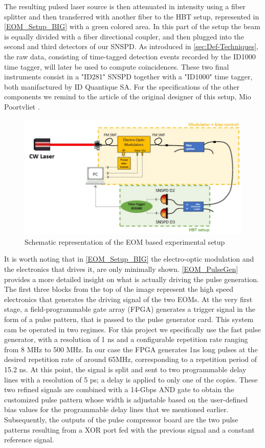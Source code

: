The resulting pulsed laser source is then attenuated in intensity using a fiber splitter and then transferred with another fiber to the HBT setup, represented in \autoref{EOM_Setup_BIG} with a green colored area.
In this part of the setup the beam is equally divided with a fiber directional coupler, and then plugged into the second and third detectors of our SNSPD. As introduced in \autoref{sec:Def-Techniques}, the raw data, consisting of time-tagged detection events recorded by the ID1000 time tagger, will later be used to compute coincidences. These two final instruments consist in a "ID281" SNSPD together with a "ID1000" time tagger, both manifactured by ID Quantique SA.
For the specifications of the other components we remind to the article of the original designer of this setup, Mio Poortvliet \cite{MioArticle}.

\begin{figure}[hbtp]
\centering
\includegraphics[width=1\textwidth]{EOMsetupBIG.jpg}
\caption{Schematic representation of the EOM based experimental setup}
\label{EOM_Setup_BIG}
\end{figure}
It is worth noting that in \autoref{EOM_Setup_BIG} the electro-optic modulation and the electronics that drives it, are only minimally shown. \autoref{EOM_PulseGen} provides a more detailed insight on what is actually driving the pulse generation.
The first three blocks from the top of the image represent the high speed electronics that generates the driving signal of the two EOMs.
At the very first stage, a field-programmable gate array (FPGA) generates a trigger signal in the form of a pulse pattern, that is passed to the pulse generator card. This system cam be operated in two regimes. For this project we specifically use the fast pulse generator, with a resolution of 1 ns and a configurable repetition rate ranging from 8 MHz to 500 MHz.
In our case the FPGA generates 1ns long pulses at the desired repetition rate of around 65MHz, corresponding to a repetition period of 15.2 ns.  
At this point, the signal is split and sent to two programmable delay lines with a resolution of 5 ps; a delay is applied to only one of the copies.
These two refined signals are combined with a 14-Gbps AND gate to obtain the customized pulse pattern whose width is adjustable based on the user-defined bias values for the programmable delay lines that we mentioned earlier.
Subsequently, the outputs of the pulse compressor board are the two pulse patterns resulting from a XOR port fed with the previous signal and a constant reference signal.

